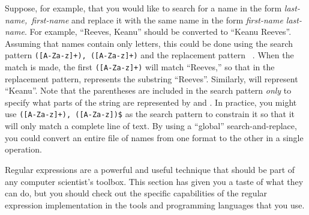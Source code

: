 Suppose, for example, that you would like to search for
a name in the form \textit{last-name,~first-name} and
replace it with the same name in the form \textit{first-name last-name}.
For example, ``Reeves, Keanu'' should be converted to ``Keanu Reeves''.
Assuming that names contain only letters,
this could be done using the search pattern \texttt{([A-Za-z]+),~([A-Za-z]+)}
and the replacement pattern \texttt{ }.  When the match is
made, the first \texttt{([A-Za-z]+)} will match ``Reeves,'' 
so that in the replacement pattern, \texttt{} represents the
substring ``Reeves''. Similarly, \texttt{} will represent
``Keanu''.  Note that the parentheses
are included in the search pattern \textit{only} to specify what parts
of the string are represented by \texttt{} and \texttt{}.
In practice, you might use \texttt{\sol([A-Za-z]+),~([A-Za-z])\$}
as the search pattern to constrain it so that it will only 
match a complete line of text.  By using a ``global'' search-and-replace,
you could convert an entire file of names from one format to the other
in a single operation.

\medskip

Regular expressions are a powerful and useful technique that
should be part of any computer scientist's toolbox.  This section
has given you a taste of what they can do, but you should check
out the specific capabilities of the regular expression implementation
in the tools and programming languages that you use.




